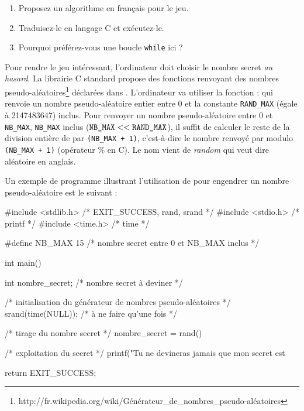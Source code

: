 \begin{enumerate}
\item Proposez un algorithme en français pour le jeu.
\item Traduisez-le en langage C et exécutez-le.
\item Pourquoi préférez-vous une boucle \verb|while| ici ?
\end{enumerate}

Pour rendre le jeu intéressant, l'ordinateur doit choisir le nombre secret \emph{au hasard}. La librairie C standard propose des fonctions renvoyant des nombres pseudo-aléatoires\footnote{http://fr.wikipedia.org/wiki/Générateur\_de\_nombres\_pseudo-aléatoires} déclarées dans . L'ordinateur va utiliser la fonction :
qui renvoie un nombre pseudo-aléatoire entier entre 0 et la constante
\verb|RAND_MAX| (égale à 2147483647) inclus. Pour renvoyer un nombre
pseudo-aléatoire entre 0 et \verb|NB_MAX|, \verb|NB_MAX| inclus
($\verb|NB_MAX| << \verb|RAND_MAX|$), il suffit de calculer le reste
de la division entière de  par \verb|(NB_MAX + 1)|,
c'est-à-dire le nombre renvoyé par   modulo \verb|(NB_MAX + 1)|
(opérateur \% en C). Le nom  vient de \emph{random} qui veut dire aléatoire en anglais.

Un exemple de programme illustrant l'utilisation de  pour
engendrer un nombre pseudo-aléatoire est le suivant :
\begin{small}
\begin{listing}{1}
#include <stdlib.h> /* EXIT_SUCCESS, rand, srand */
#include <stdio.h> /* printf */
#include <time.h> /* time */

#define NB_MAX 15 /* nombre secret entre 0 et NB_MAX inclus */

int main()
{
    int nombre_secret; /* nombre secret à deviner */

    /* initialisation du générateur de nombres pseudo-aléatoires */
    srand(time(NULL)); /* à ne faire qu'une fois */

    /* tirage du nombre secret */
    nombre_secret = rand() %

    /* exploitation du secret */
    printf("Tu ne devineras jamais que mon secret est %

    return EXIT_SUCCESS;
}
\end{listing}
\end{small}


